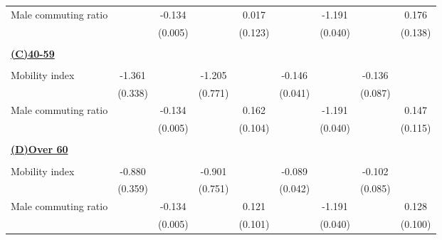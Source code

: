 \begin{tabular}{l*{8}{c}}
\addlinespace
Male commuting ratio&                     &      -0.134\sym{***}&                     &       0.017         &                     &      -1.191\sym{***}&                     &       0.176         \\
                    &                     &     (0.005)         &                     &     (0.123)         &                     &     (0.040)         &                     &     (0.138)         \\
\hline \\ \multicolumn{9}{l}{\textbf{\underline{(C)40-59}}} \\\\[-1ex]
Mobility index      &      -1.361\sym{***}&                     &      -1.205         &                     &      -0.146\sym{***}&                     &      -0.136         &                     \\
                    &     (0.338)         &                     &     (0.771)         &                     &     (0.041)         &                     &     (0.087)         &                     \\
\addlinespace
Male commuting ratio&                     &      -0.134\sym{***}&                     &       0.162         &                     &      -1.191\sym{***}&                     &       0.147         \\
                    &                     &     (0.005)         &                     &     (0.104)         &                     &     (0.040)         &                     &     (0.115)         \\
\hline \\ \multicolumn{9}{l}{\textbf{\underline{(D)Over 60}}} \\\\[-1ex]
Mobility index      &      -0.880\sym{**} &                     &      -0.901         &                     &      -0.089\sym{**} &                     &      -0.102         &                     \\
                    &     (0.359)         &                     &     (0.751)         &                     &     (0.042)         &                     &     (0.085)         &                     \\
\addlinespace
Male commuting ratio&                     &      -0.134\sym{***}&                     &       0.121         &                     &      -1.191\sym{***}&                     &       0.128         \\
                    &                     &     (0.005)         &                     &     (0.101)         &                     &     (0.040)         &                     &     (0.100)         \\

\end{tabular}
